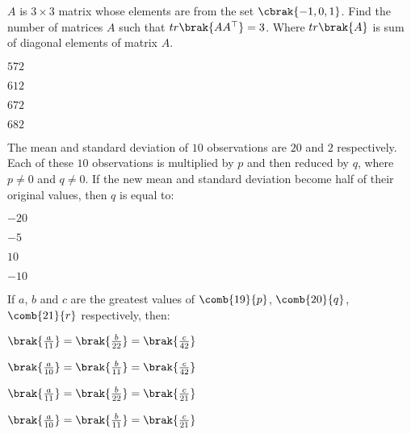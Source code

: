 \item $A$ is $3\times 3$ matrix whose elements are from the set $\cbrak{-1,0,1}$. Find the number of matrices $A$ such that $tr\brak{AA^\top}=3$. Where $tr\brak{A}$ is sum of diagonal elements of matrix $A$.

\hfill{}
\begin{enumerate}
\begin{multicols}{4}
\item $572$
\item $612$
\item $672$
\item $682$
\end{multicols}
\end{enumerate}

\item The mean and standard deviation of $10$ observations are $20$ and $2$ respectively. Each of these $10$ observations is multiplied by $p$ and then reduced by $q$, where $p\neq 0$ and $q\neq 0$. If the new mean and standard deviation become half of their original values, then $q$ is equal to:

\hfill{}
\begin{enumerate}
\begin{multicols}{4}
\item $-20$
\item $-5$
\item $10$
\item $-10$
\end{multicols}
\end{enumerate}

\item If $a$, $b$ and $c$ are the greatest values of $\comb{19}{p}$, $\comb{20}{q}$, $\comb{21}{r}$ respectively, then:

\hfill{}
\begin{enumerate}
\begin{multicols}{2}
\item $\brak{\frac{a}{11}} = \brak{\frac{b}{22}} = \brak{\frac{c}{42}}$
\item $\brak{\frac{a}{10}} = \brak{\frac{b}{11}} = \brak{\frac{c}{42}}$
\item $\brak{\frac{a}{11}} = \brak{\frac{b}{22}} = \brak{\frac{c}{21}}$
\item $\brak{\frac{a}{10}} = \brak{\frac{b}{11}} = \brak{\frac{c}{21}}$
\end{multicols}
\end{enumerate}

